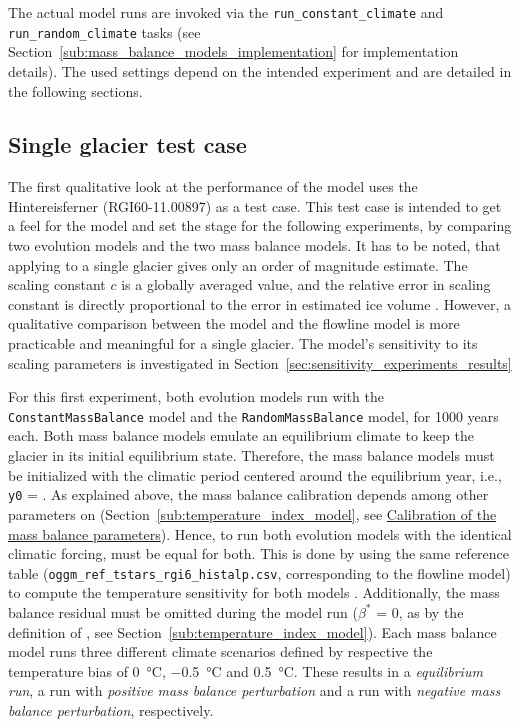     The actual model runs are invoked via the \lstinline`run_constant_climate` and \lstinline`run_random_climate` tasks (see Section~\ref{sub:mass_balance_models_implementation} for implementation details). The used settings depend on the intended experiment and are detailed in the following sections.

    \subsection{Single glacier test case} %
    \label{sub:single_glacier_test_case_setup}

        The first qualitative look at the performance of the \vas{} model uses the Hintereisferner (RGI60-11.00897) as a test case. This test case is intended to get a feel for the model and set the stage for the following experiments, by comparing two evolution models and the two mass balance models.
        It has to be noted, that applying \vas{} to a single glacier gives only an order of magnitude estimate. The scaling constant $c$ is a globally averaged value, and the relative error in scaling constant is directly proportional to the error in estimated ice volume \citep{Bahr2015}. However, a qualitative comparison between the \vas{} model and the flowline model is more practicable and meaningful for a single glacier. The model's sensitivity to its scaling parameters is investigated in Section~\ref{sec:sensitivity_experiments_results}

        For this first experiment, both evolution models run with the \lstinline`ConstantMassBalance` model and the \lstinline`RandomMassBalance` model, for 1000 years each. Both mass balance models emulate an equilibrium climate to keep the glacier in its initial equilibrium state. Therefore, the mass balance models must be initialized with the climatic period centered around the equilibrium year, i.e., \lstinline`y0` = \tstar{}. As explained above, the mass balance calibration depends among other parameters on \tstar{} (Section~\ref{sub:temperature_index_model}, see \hyperref[ssub:mb_calib]{Calibration of the mass balance parameters}). Hence, to run both evolution models with the identical climatic forcing, \tstar{} must be equal for both. This is done by using the same \tstar{} reference table (\lstinline`oggm_ref_tstars_rgi6_histalp.csv`, corresponding to the flowline model) to compute the temperature sensitivity \mustar{} for both models . Additionally, the mass balance residual must be omitted during the model run ($\beta^*$ = 0, as by the definition of \mustar{}, see Section~\ref{sub:temperature_index_model}). Each mass balance model runs three different climate scenarios defined by respective the temperature bias of \SI{0}{\celsius}, \SI{-0.5}{\celsius} and \SI{+0.5}{\celsius}. These results in a \emph{equilibrium run}, a run with \emph{positive mass balance perturbation} and a run with \emph{negative mass balance perturbation}, respectively.
    
